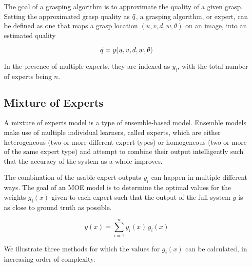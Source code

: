 \documentclass[letterpaper, 10 pt, conference]{ieeeconf}
\begin{document}
The goal of a grasping algorithm is to approximate the quality of a given grasp.  Setting the approximated grasp quality as $\Tilde{q}$, a grasping algorithm, or expert, can be defined as one that maps a grasp location $(u, v, d, w, \theta)$ on an image, into an estimated quality

\begin{equation}
    \Tilde{q} = y(u, v, d, w, \theta)
\end{equation}

In the presence of multiple experts, they are indexed as $y_i$, with the total number of experts being $n$.

\subsection{Mixture of Experts}
\label{sec:moe_formulation}
A mixture of experts model is a type of ensemble-based model.  Ensemble models make use of multiple individual learners, called experts, which are either heterogeneous (two or more different expert types) or homogeneous (two or more of the same expert type) \cite{ensembleTypes} and attempt to combine their output intelligently such that the accuracy of the system as a whole improves.




The combination of the usable expert outputs $y_i$ can happen in multiple different ways.  The goal of an MOE model is to determine the optimal values for the weights $g_i(x)$ given to each expert such that the output of the full system $y$ is as close to ground truth as possible.

\begin{equation}
    y(x) = \sum_{i=1}^{n}{y_i(x)\,g_i(x)}
\end{equation}

We illustrate three methods for which the values for $g_i(x)$ can be calculated, in increasing order of complexity:
\end{document}
